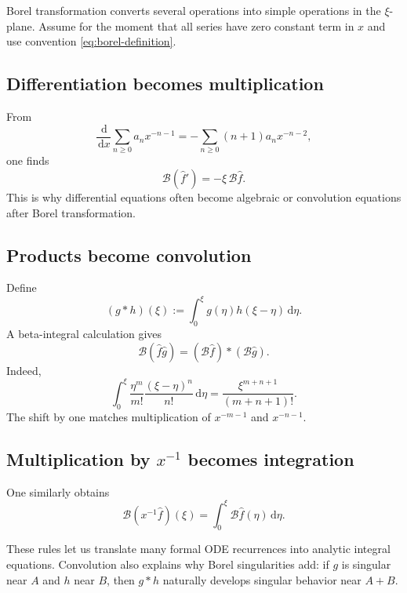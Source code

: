 \documentclass[11pt,openany]{book}
\theoremstyle{definition}
\theoremstyle{plain}
\theoremstyle{remark}
\newcommand{\dd}{\,\mathrm{d}}
\newcommand{\trans}[1]{\widehat{#1}}
\newcommand{\Borel}{\mathcal{B}}
\begin{document}
Borel transformation converts several operations into simple operations in the $\xi$-plane. Assume for the moment that all series have zero constant term in $x$ and use convention \eqref{eq:borel-definition}.

\subsection{Differentiation becomes multiplication}

From
\[
 \frac{\dd}{\dd x}\sum_{n\ge0}a_nx^{-n-1}
 =-\sum_{n\ge0}(n+1)a_nx^{-n-2},
\]
one finds
\begin{equation}\label{eq:borel-derivative}
 \Borel(\trans f')=-\xi\,\Borel\trans f.
\end{equation}
This is why differential equations often become algebraic or convolution equations after Borel transformation.

\subsection{Products become convolution}

Define
\begin{equation}\label{eq:borel-convolution}
 (g*h)(\xi):=\int_0^\xi g(\eta)h(\xi-\eta)\dd\eta.
\end{equation}
A beta-integral calculation gives
\begin{equation}\label{eq:borel-product}
 \Borel(\trans f\trans g)
 =(\Borel\trans f)*(\Borel\trans g).
\end{equation}
Indeed,
\[
 \int_0^\xi\frac{\eta^m}{m!}
 \frac{(\xi-\eta)^n}{n!}\dd\eta
 =\frac{\xi^{m+n+1}}{(m+n+1)!}.
\]
The shift by one matches multiplication of $x^{-m-1}$ and $x^{-n-1}$.

\subsection{Multiplication by \texorpdfstring{$x^{-1}$}{1/x} becomes integration}

One similarly obtains
\begin{equation}\label{eq:borel-xinverse}
 \Borel(x^{-1}\trans f)(\xi)
 =\int_0^\xi\Borel\trans f(\eta)\dd\eta.
\end{equation}

These rules let us translate many formal ODE recurrences into analytic integral equations. Convolution also explains why Borel singularities add: if $g$ is singular near $A$ and $h$ near $B$, then $g*h$ naturally develops singular behavior near $A+B$.
\end{document}
